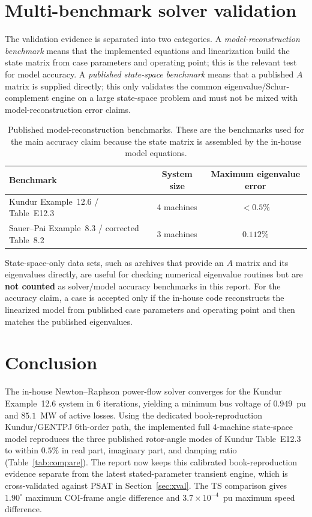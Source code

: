 \documentclass[12pt,a4paper]{article}
\begin{document}
\section{Multi-benchmark solver validation}
\label{sec:multibench}

The validation evidence is separated into two categories.  A
\emph{model-reconstruction benchmark} means that the implemented equations and
linearization build the state matrix from case parameters and operating point;
this is the relevant test for model accuracy.  A \emph{published state-space
benchmark} means that a published $A$ matrix is supplied directly; this only
validates the common eigenvalue/Schur-complement engine on a large state-space
problem and must not be mixed with model-reconstruction error claims.

\begin{table}[H]
\centering
\caption{Published model-reconstruction benchmarks. These are the benchmarks
used for the main accuracy claim because the state matrix is assembled by the
in-house model equations.}
\label{tab:modelbench}
\begin{tabular}{lcc}
\toprule
Benchmark & System size & Maximum eigenvalue error \\
\midrule
Kundur Example~12.6 / Table~E12.3 & 4 machines & $<0.5\%$ \\
Sauer--Pai Example~8.3 / corrected Table~8.2 & 3 machines & $0.112\%$ \\
\bottomrule
\end{tabular}
\end{table}

State-space-only data sets, such as archives that provide an $A$ matrix and its
eigenvalues directly, are useful for checking numerical eigenvalue routines but
are \textbf{not counted} as solver/model accuracy benchmarks in this report.
For the accuracy claim, a case is accepted only if the in-house code reconstructs
the linearized model from published case parameters and operating point and then
matches the published eigenvalues.

\section{Conclusion}
\label{sec:concl}

The in-house Newton--Raphson power-flow solver converges for the Kundur
Example~12.6 system in $6$ iterations, yielding a minimum bus voltage of
$0.949$~pu and $85.1$~MW of active losses. Using the dedicated book-reproduction Kundur/GENTPJ 6th-order path, the
implemented full 4-machine state-space model reproduces the three published
rotor-angle modes of Kundur Table~E12.3 to within $0.5\%$ in real part,
imaginary part, and damping ratio (Table~\ref{tab:compare}). The report now
keeps this calibrated book-reproduction evidence separate from the latest
stated-parameter transient engine, which is cross-validated against PSAT in
Section~\ref{sec:xval}. The TS comparison gives $1.90^\circ$ maximum
COI-frame angle difference and $3.7\times10^{-4}$~pu maximum speed difference.
\end{document}
